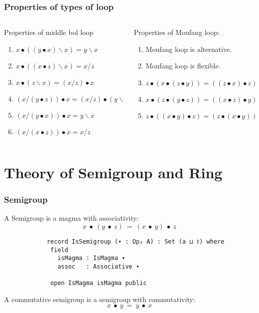 \documentclass[xcolor={dvipsnames}]{beamer}
\begin{document}
  \begin{frame}[fragile]
    \frametitle{Properties of types of loop}  
    \begin{columns}
      \begin{column}{0.4\textwidth}
        Properties of middle bol loop
        \begin{enumerate}
        \item \(x∙((y∙x)\backslash x)=y\backslash x\) 
        \item \(x∙((x∙z)\backslash x)=x/z\)
        \item \(x∙ (z\backslash x)=(x/z)∙x\)
        \item \((x/(y∙z))∙x=(x/z)∙(y\backslash x)\)
        \item \((x/(y∙x))∙x=y\backslash x\)
        \item \((x/(x∙z))∙x= x/ z\)
        \end{enumerate}
      \end{column}
      \hfill
      \begin{column}{0.575\textwidth}
        Properties of Moufang loop:
        \begin{enumerate}
        \item Moufang loop is alternative.
        \item Moufang loop is flexible.
        \item $z∙(x∙(z∙y))=((z∙x)∙z)∙y$
        \item $x∙(z∙(y∙z))=((x∙z)∙y)∙z$ 
        \item $z∙((x∙y)∙z)=(z∙ (x∙y))∙z$ 
        \end{enumerate}
      \end{column}
    \end{columns}
  \end{frame}

\section{Theory of Semigroup and Ring}

\begin{frame}[fragile]
    \frametitle{Semigroup} 
     A Semigroup is a magma with associativity: 
     \[x\ ∙\ (y\ ∙\ z)\ =\ (x\ ∙\ y)\ ∙\ z\]  
        \begin{verbatim}
            record IsSemigroup (∙ : Op₂ A) : Set (a ⊔ ℓ) where
             field
               isMagma : IsMagma ∙
               assoc   : Associative ∙
            
             open IsMagma isMagma public
          \end{verbatim}
        A commutative semigroup is a semigroup with commutativity:
        \[x\ ∙\ y\ =\ y\ ∙\ x\]
  \end{frame}
\end{document}
